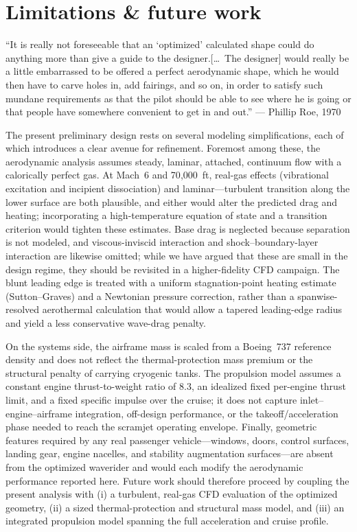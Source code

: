 \documentclass[10pt,a4paper]{article}
\begin{document}
\section{Limitations \& future work}

``It is really not foreseeable that an `optimized' calculated shape could do anything more than give a guide to the designer.\@ [\ldots\ The designer] would really be a little embarrassed to be offered a perfect aerodynamic shape, which he would then have to carve holes in, add fairings, and so on, in order to satisfy such mundane requirements as that the pilot should be able to see where he is going or that people have somewhere convenient to get in and out.'' --- Phillip Roe, 1970

The present preliminary design rests on several modeling simplifications, each of which introduces a clear avenue for refinement. Foremost among these, the aerodynamic analysis assumes steady, laminar, attached, continuum flow with a calorically perfect gas. At Mach~6 and 70{,}000~ft, real-gas effects (vibrational excitation and incipient dissociation) and laminar---turbulent transition along the lower surface are both plausible, and either would alter the predicted drag and heating; incorporating a high-temperature equation of state and a transition criterion would tighten these estimates. Base drag is neglected because separation is not modeled, and viscous-inviscid interaction and shock--boundary-layer interaction are likewise omitted; while we have argued that these are small in the design regime, they should be revisited in a higher-fidelity CFD campaign. The blunt leading edge is treated with a uniform stagnation-point heating estimate (Sutton--Graves) and a Newtonian pressure correction, rather than a spanwise-resolved aerothermal calculation that would allow a tapered leading-edge radius and yield a less conservative wave-drag penalty.

On the systems side, the airframe mass is scaled from a Boeing~737 reference density and does not reflect the thermal-protection mass premium or the structural penalty of carrying cryogenic tanks. The propulsion model assumes a constant engine thrust-to-weight ratio of 8.3, an idealized fixed per-engine thrust limit, and a fixed specific impulse over the cruise; it does not capture inlet--engine--airframe integration, off-design performance, or the takeoff/acceleration phase needed to reach the scramjet operating envelope. Finally, geometric features required by any real passenger vehicle---windows, doors, control surfaces, landing gear, engine nacelles, and stability augmentation surfaces---are absent from the optimized waverider and would each modify the aerodynamic performance reported here. Future work should therefore proceed by coupling the present analysis with (i) a turbulent, real-gas CFD evaluation of the optimized geometry, (ii) a sized thermal-protection and structural mass model, and (iii) an integrated propulsion model spanning the full acceleration and cruise profile.
\end{document}
